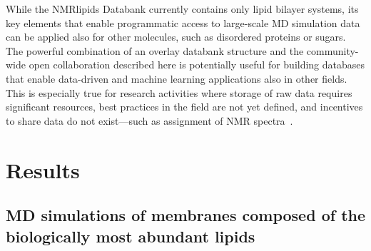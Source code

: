 \documentclass[fleqn,10pt]{wlscirep}
\begin{document}
While the NMRlipids Databank currently contains only lipid bilayer systems, its key elements that enable programmatic access to large-scale MD simulation data can be applied also for other molecules, such as disordered proteins or sugars.
The powerful combination of an overlay databank structure and the community-wide open collaboration  described here is potentially useful for building databases that enable data-driven and machine learning applications also in other fields. This is especially true for research activities where storage of raw data requires significant resources, best practices in the field are not yet defined, and incentives to share data do not exist---such as assignment of NMR spectra~\cite{klukowski22}.


\section{Results}

\subsection{MD simulations of membranes composed of the biologically most abundant lipids}
\end{document}
